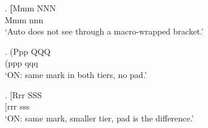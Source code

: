 \GlossPhantomAlign
\ex. \gll \textbf{[}Mmm NNN \\
     Mmm nnn \\
\glt `Auto does not see through a macro-wrapped bracket.'


\ex. \gll (Ppp QQQ \\
     (ppp qqq \\
\glt `ON: same mark in both tiers, no pad.'

{%
\ex. \gll [Rrr SSS \\
     [rrr sss \\
\glt `ON: same mark, smaller tier, pad is the difference.'
}

